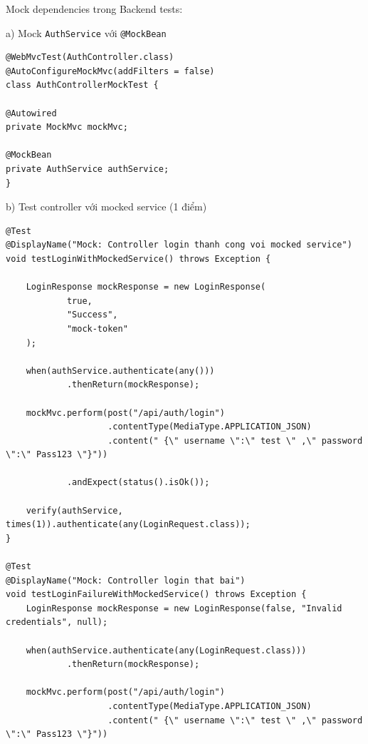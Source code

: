 \documentclass[a4paper,12pt]{article}
\begin{document}
{Mock dependencies trong Backend tests:


a) Mock \texttt{AuthService} với \texttt{@MockBean}
\begin{tcolorbox}[breakable, colback=green!5,colframe=black!50,title=Mock AuthService Với @MockBean ]
\begin{lstlisting}
@WebMvcTest(AuthController.class)
@AutoConfigureMockMvc(addFilters = false)
class AuthControllerMockTest {

@Autowired
private MockMvc mockMvc;

@MockBean
private AuthService authService;
}
\end{lstlisting}
\end{tcolorbox}


b) Test controller với mocked service (1 điểm)
\begin{tcolorbox}[breakable, colback=green!5,colframe=black!50,title=Test Controller Với Mocked Service ]
\begin{lstlisting}
@Test
@DisplayName("Mock: Controller login thanh cong voi mocked service")
void testLoginWithMockedService() throws Exception {

    LoginResponse mockResponse = new LoginResponse(
            true,
            "Success",
            "mock-token"
    );

    when(authService.authenticate(any()))
            .thenReturn(mockResponse);

    mockMvc.perform(post("/api/auth/login")
                    .contentType(MediaType.APPLICATION_JSON)
                    .content(" {\" username \":\" test \" ,\" password \":\" Pass123 \"}"))

            .andExpect(status().isOk());

    verify(authService, times(1)).authenticate(any(LoginRequest.class));
}

@Test
@DisplayName("Mock: Controller login that bai")
void testLoginFailureWithMockedService() throws Exception {
    LoginResponse mockResponse = new LoginResponse(false, "Invalid credentials", null);

    when(authService.authenticate(any(LoginRequest.class)))
            .thenReturn(mockResponse);

    mockMvc.perform(post("/api/auth/login")
                    .contentType(MediaType.APPLICATION_JSON)
                    .content(" {\" username \":\" test \" ,\" password \":\" Pass123 \"}"))


\end{lstlisting}
\end{tcolorbox}}
\end{document}
